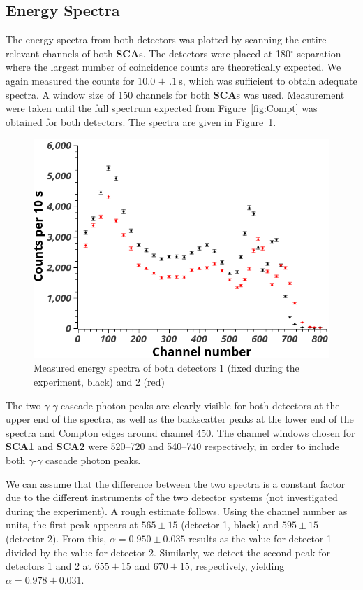 \documentclass[twocolumn]{article}
\begin{document}
\subsection{Energy Spectra}
The energy spectra from both detectors was plotted by scanning the entire relevant channels of both \textbf{SCA}s. The detectors were placed at 180$^{\circ}$ separation where the largest number of coincidence counts are theoretically expected. We again measured the counts for $\SI[separate-uncertainty = true]{10.0(1) }{\second}$, which was sufficient to obtain adequate spectra. A window size of 150 channels for both \textbf{SCA}s was used. Measurement were taken until the full spectrum expected from Figure~\ref{fig:Compt} was obtained for both detectors. The spectra are given in Figure~\ref{fig:spectra}.
\begin{figure}[!h]
	\centering
	\includegraphics[width=0.9\linewidth]{detectors3.png}
	\caption{Measured energy spectra of both detectors 1 (fixed during the experiment, black) and 2 (red)}
	\label{fig:spectra}
\end{figure}
The two $\gamma$-$\gamma$ cascade photon peaks are clearly visible for both detectors at the upper end of the spectra, as well as the backscatter peaks at the lower end of the spectra and Compton edges around channel 450. The channel windows chosen for \textbf{SCA1} and \textbf{SCA2} were 520--720 and 540--740 respectively, in order to include both $\gamma$-$\gamma$ cascade photon peaks.
\par We can assume that the difference between the two spectra is a constant factor due to the different instruments of the two detector systems (not investigated during the experiment). A rough estimate follows. Using the channel number as units, the first peak appears at $565 \pm 15$ (detector 1, black) and $595 \pm 15$ (detector 2). From this, $\alpha = 0.950 \pm 0.035$ results as the value for detector 1 divided by the value for detector 2. Similarly, we detect the second peak for detectors 1 and 2 at $655 \pm 15$ and $670 \pm 15$, respectively, yielding $\alpha = 0.978 \pm 0.031$.
\end{document}
